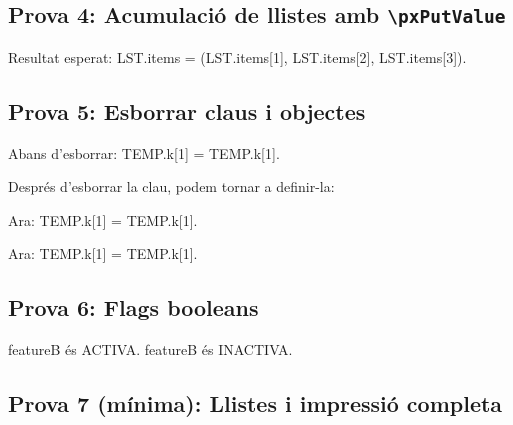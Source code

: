\documentclass{article}
\begin{document}
\bigskip

\subsection*{Prova 4: Acumulació de llistes amb \texttt{\textbackslash pxPutValue}}



Resultat esperat: LST.items = (\pxGET LST.items[1], \pxGET LST.items[2], \pxGET LST.items[3]).

\bigskip
%
\subsection*{Prova 5: Esborrar claus i objectes}


Abans d'esborrar: TEMP.k[1] = \pxGET TEMP.k[1].


Després d'esborrar la clau, podem tornar a definir-la:


Ara: TEMP.k[1] = \pxGET TEMP.k[1].


Ara: TEMP.k[1] = \pxGET TEMP.k[1].
\bigskip

\subsection*{Prova 6: Flags booleans}




\par

	{featureB és ACTIVA.}
	{featureB és INACTIVA.}

\bigskip

\subsection*{Prova 7 (mínima): Llistes i impressió completa}

\end{document}
